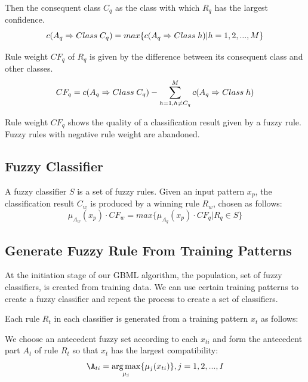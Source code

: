 \documentclass[conference]{IEEEtran}
\begin{document}
  Then the consequent class $C_q$ as the class with which $R_q$ has the largest confidence.
  \begin{equation}
  \scriptsize c(A_q \Rightarrow Class\;C_q)=max\{c(A_q \Rightarrow Class\;h)|h=1,2,...,M\}
\end{equation}
  
  Rule weight $CF_q$ of $R_q$ is given by the difference between its consequent class and other classes.
  \begin{equation}
  \scriptsize CF_q = c(A_q\Rightarrow Class\;C_q)-\sum\limits_{h=1, h\neq C_q}^{M}c(A_q\Rightarrow Class \; h)
\end{equation}

  Rule weight $CF_q$  shows the quality of a classification result given by a fuzzy rule. Fuzzy rules with negative rule weight are abandoned.
  
  \subsection{Fuzzy Classifier}
  
  A fuzzy classifier $S$ is a set of fuzzy rules. Given an input pattern $x_p$, the classification result $C_w$ is produced by a winning rule $R_w$, chosen as follows:
  \begin{equation}\mu_{A_w}(x_p) \cdot CF_w = max\{\mu_{A_q}(x_p)\cdot CF_q|R_q\in S\}\end{equation}
  \subsection{Generate Fuzzy Rule From Training Patterns}
  At the initiation stage of our GBML algorithm, the population, set of fuzzy classifiers, is created from training data. We can use certain training patterns to create a fuzzy classifier and repeat the process to create a set of classifiers.
  
  Each rule $R_t$ in each classifier is generated from a training pattern $x_t$ as follows:

  We choose an antecedent fuzzy set according to each $x_{ti}$ and form the antecedent part $A_t$ of rule $R_t$ so that $x_{t}$ has the largest compatibility:
  \begin{equation} \A_{ti} = \underset{\mu_j}{\arg\max}\{\mu_{j}(x_{ti})\},j=1,2,...,I\end{equation}
  
\end{document}
